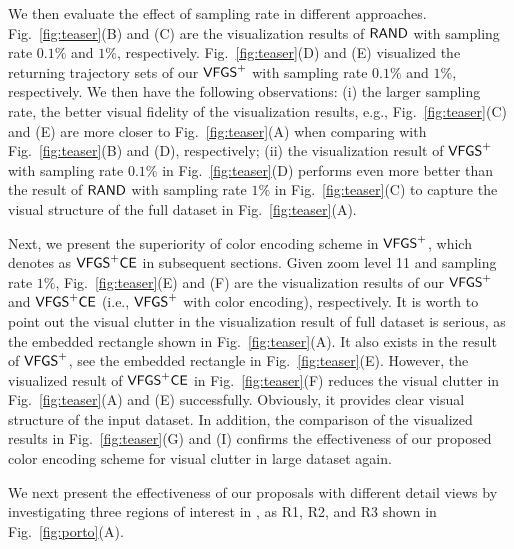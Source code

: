 We then evaluate the effect of sampling rate in different approaches.
Fig.~\ref{fig:teaser}(B) and (C) are the visualization results of $\mathsf{RAND}{}$ with sampling rate $0.1\%$ and $1\%$, respectively.
Fig.~\ref{fig:teaser}(D) and (E) visualized the returning trajectory sets of our $\mathsf{VFGS}^{+}{}$ with sampling rate $0.1\%$ and $1\%$, respectively.
We then have the following observations:
(i) the larger sampling rate, the better visual fidelity of the visualization results, e.g.,
Fig.~\ref{fig:teaser}(C) and (E) are more closer to Fig.~\ref{fig:teaser}(A) when comparing with Fig.~\ref{fig:teaser}(B) and (D), respectively;
(ii) the visualization result of $\mathsf{VFGS}^{+}$ with sampling rate $0.1\%$ in Fig.~\ref{fig:teaser}(D)
performs even more better than the result of $\mathsf{RAND}{}$ with sampling rate $1\%$ in Fig.~\ref{fig:teaser}(C) to capture the visual structure of the full dataset in Fig.~\ref{fig:teaser}(A).


Next, we present the superiority of color encoding scheme in $\mathsf{VFGS}^{+}$, which denotes as $\mathsf{VFGS}^{+}\mathsf{CE}$ in subsequent sections.
Given zoom level 11 and sampling rate $1\%$, Fig.~\ref{fig:teaser}(E) and (F) are the visualization results of our $\mathsf{VFGS}^{+}$ and $\mathsf{VFGS}^{+}\mathsf{CE}$ (i.e., $\mathsf{VFGS}^{+}$ with color encoding), respectively.
It is worth to point out the visual clutter in the visualization result of full dataset is serious, as the embedded rectangle shown in Fig.~\ref{fig:teaser}(A).
It also exists in the result of $\mathsf{VFGS}^{+}$, see the embedded rectangle in Fig.~\ref{fig:teaser}(E).
However, the visualized result of $\mathsf{VFGS}^{+}\mathsf{CE}$ in Fig.~\ref{fig:teaser}(F) reduces the visual clutter in Fig.~\ref{fig:teaser}(A) and (E) successfully.
Obviously, it provides clear visual structure of the input dataset.
In addition, the comparison of the visualized results in Fig.~\ref{fig:teaser}(G) and (I) confirms the effectiveness of our proposed color encoding scheme for visual clutter in large dataset again.

We next present the effectiveness of our proposals with different detail views by investigating three regions of interest in \pt{}, as R1, R2, and R3 shown in Fig.~\ref{fig:porto}(A).

